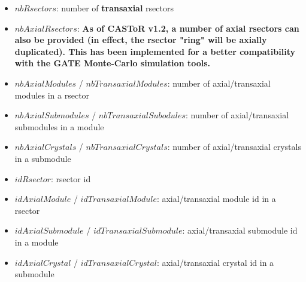 \documentclass[a4paper, 11pt]{article}
\begin{document}
\begin{itemize}
  \item $nbRsectors$: number of \textbf{transaxial} rsectors
  \item $nbAxialRsectors$: \textbf{As of CASToR v1.2, a number of axial rsectors can also be provided (in effect, the rsector "ring" will be axially duplicated). This has been implemented for a better compatibility with the GATE Monte-Carlo simulation tools.}
  \item $nbAxialModules$ / $nbTransaxialModules$: number of axial/transaxial modules in a rsector
  \item $nbAxialSubmodules$ / $nbTransaxialSubodules$: number of axial/transaxial submodules in a module
  \item $nbAxialCrystals$ / $nbTransaxialCrystals$: number of axial/transaxial crystals in a submodule
  \item $idRsector$: rsector id
  \item $idAxialModule$ / $idTransaxialModule$: axial/transaxial module id in a rsector
  \item $idAxialSubmodule$ / $idTransaxialSubmodule$: axial/transaxial submodule id in a module
  \item $idAxialCrystal$ / $idTransaxialCrystal$: axial/transaxial crystal id in a submodule
\end{itemize}
\end{document}
